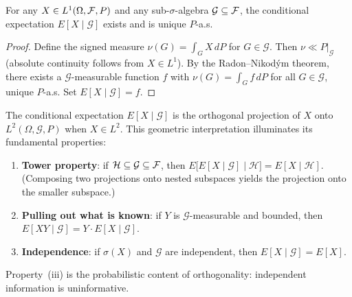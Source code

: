 \begin{theorem}\label{thm:cond-exp-exists}
For any $X \in L^1(\Omega, \mathcal{F}, P)$ and any sub-$\sigma$-algebra $\mathcal{G} \subseteq \mathcal{F}$, the conditional expectation $E[X \mid \mathcal{G}]$ exists and is unique $P$-a.s.
\end{theorem}

\begin{proof}
Define the signed measure $\nu(G) = \int_G X\, dP$ for $G \in \mathcal{G}$. Then $\nu \ll P|_\mathcal{G}$ (absolute continuity follows from $X \in L^1$). By the Radon--Nikod\'ym theorem, there exists a $\mathcal{G}$-measurable function $f$ with $\nu(G) = \int_G f\, dP$ for all $G \in \mathcal{G}$, unique $P$-a.s. Set $E[X \mid \mathcal{G}] = f$.
\end{proof}

\begin{remark}
The conditional expectation $E[X \mid \mathcal{G}]$ is the orthogonal projection of $X$ onto $L^2(\Omega, \mathcal{G}, P)$ when $X \in L^2$. This geometric interpretation illuminates its fundamental properties:
\begin{enumerate}[label=(\roman*)]
\item \textbf{Tower property}: if $\mathcal{H} \subseteq \mathcal{G} \subseteq \mathcal{F}$, then $E\bigl[E[X \mid \mathcal{G}] \mid \mathcal{H}\bigr] = E[X \mid \mathcal{H}]$. (Composing two projections onto nested subspaces yields the projection onto the smaller subspace.)
\item \textbf{Pulling out what is known}: if $Y$ is $\mathcal{G}$-measurable and bounded, then $E[XY \mid \mathcal{G}] = Y \cdot E[X \mid \mathcal{G}]$.
\item \textbf{Independence}: if $\sigma(X)$ and $\mathcal{G}$ are independent, then $E[X \mid \mathcal{G}] = E[X]$.
\end{enumerate}
Property~(iii) is the probabilistic content of orthogonality: independent information is uninformative.
\end{remark}

